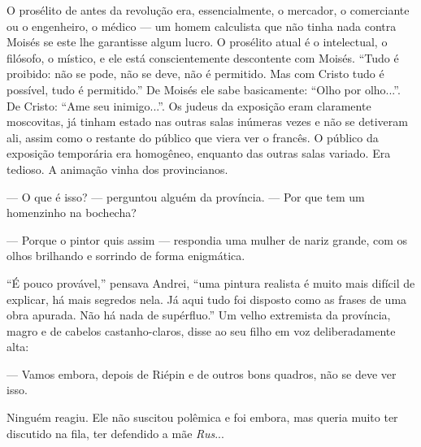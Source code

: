 O prosélito de antes da revolução era, essencialmente, o mercador, o
comerciante ou o engenheiro, o médico --- um homem calculista que não
tinha nada contra Moisés se este lhe garantisse algum lucro. O prosélito
atual é o intelectual, o filósofo, o místico, e ele está conscientemente
descontente com Moisés. ``Tudo é proibido: não se pode, não se deve, não
é permitido. Mas com Cristo tudo é possível, tudo é permitido.'' De
Moisés ele sabe basicamente: ``Olho por olho...''. De Cristo: ``Ame seu
inimigo...''. Os judeus da exposição eram claramente moscovitas, já
tinham estado nas outras salas inúmeras vezes e não se detiveram ali,
assim como o restante do público que viera ver o francês. O público da
exposição temporária era homogêneo, enquanto das outras salas variado.
Era tedioso. A animação vinha dos provincianos.

--- O que é isso? --- perguntou alguém da província. --- Por que tem um
homenzinho na bochecha?

--- Porque o pintor quis assim --- respondia uma mulher de nariz grande,
com os olhos brilhando e sorrindo de forma enigmática.

``É pouco provável,'' pensava Andrei, ``uma pintura realista é muito
mais difícil de explicar, há mais segredos nela. Já aqui tudo foi
disposto como as frases de uma obra apurada. Não há nada de supérfluo.''
Um velho extremista da província, magro e de cabelos castanho-claros,
disse ao seu filho em voz deliberadamente alta:

--- Vamos embora, depois de Riépin e de outros bons quadros, não se deve
ver isso.

Ninguém reagiu. Ele não suscitou polêmica e foi embora, mas queria muito
ter discutido na fila, ter defendido a mãe \emph{Rus}...

